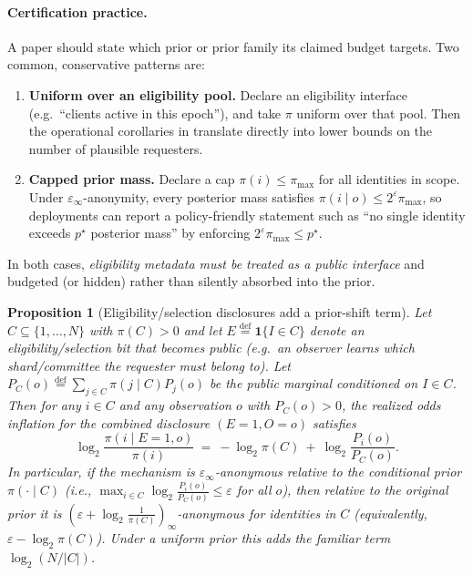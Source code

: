 \documentclass[11pt]{article}
\newcommand{\one}{\mathbf{1}}
\newcommand{\defeq}{\stackrel{\mathrm{def}}{=}}
\newtheorem{proposition}{Proposition}
\theoremstyle{definition}
\theoremstyle{remark}
\begin{document}
\paragraph{Certification practice.}
A paper should state which prior or prior family its claimed budget targets.
Two common, conservative patterns are:
\begin{enumerate}[leftmargin=*]
\item \textbf{Uniform over an eligibility pool.} Declare an eligibility interface (e.g.\ ``clients active in this epoch''), and take $\pi$ uniform over that pool.
Then the operational corollaries in  translate directly into lower bounds on the number of plausible requesters.
\item \textbf{Capped prior mass.} Declare a cap $\pi(i)\le \pi_{\max}$ for all identities in scope.
Under $\varepsilon_\infty$-anonymity, every posterior mass satisfies $\pi(i\mid o)\le 2^{\varepsilon}\pi_{\max}$, so deployments can report a policy-friendly statement such as ``no single identity exceeds $p^\star$ posterior mass'' by enforcing $2^{\varepsilon}\pi_{\max}\le p^\star$.
\end{enumerate}
In both cases, \emph{eligibility metadata must be treated as a public interface} and budgeted (or hidden) rather than silently absorbed into the prior.

\begin{proposition}[Eligibility/selection disclosures add a prior-shift term]\label{prop:selection}
Let $C\subseteq\{1,\dots,N\}$ with $\pi(C)>0$ and let $E\defeq\one\{I\in C\}$ denote an eligibility/selection bit that becomes public (e.g.\ an observer learns which shard/committee the requester must belong to).
Let $P_C(o)\defeq\sum_{j\in C}\pi(j\mid C)P_j(o)$ be the public marginal conditioned on $I\in C$.
Then for any $i\in C$ and any observation $o$ with $P_C(o)>0$, the realized odds inflation for the combined disclosure $(E{=}1,O{=}o)$ satisfies
\[
\log_2\frac{\pi(i\mid E{=}1,o)}{\pi(i)}\ =\ -\log_2 \pi(C)\ +\ \log_2\frac{P_i(o)}{P_C(o)}.
\]
In particular, if the mechanism is $\varepsilon_\infty$-anonymous relative to the conditional prior $\pi(\cdot\mid C)$ (i.e., $\max_{i\in C}\log_2\tfrac{P_i(o)}{P_C(o)}\le\varepsilon$ for all $o$), then relative to the original prior it is $(\varepsilon+\log_2\tfrac{1}{\pi(C)})_\infty$-anonymous for identities in $C$ (equivalently, $\varepsilon-\log_2\pi(C)$).
Under a uniform prior this adds the familiar term $\log_2(N/|C|)$.
\end{proposition}
\end{document}
